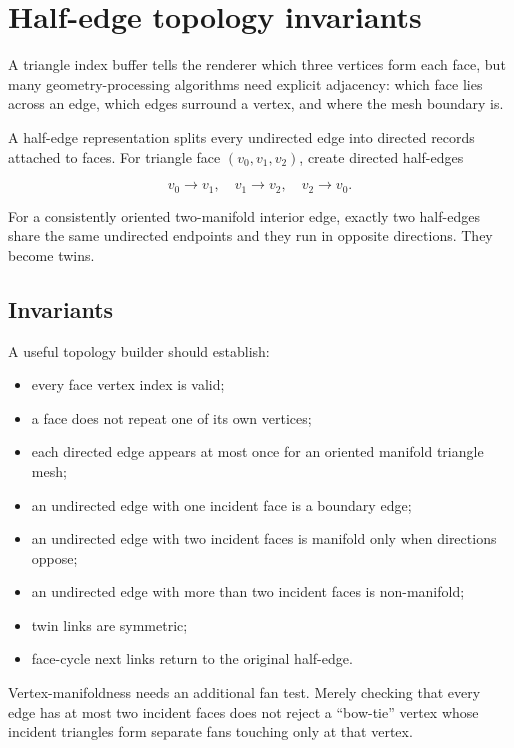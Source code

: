 \hypertarget{appendix-faac749c9cdd}{}\label{referencestart:appendix-faac749c9cdd}
\section{Half-edge topology invariants}\label{appendix-faac749c9cdd-half-edge-topology-invariants}

A triangle index buffer tells the renderer which three vertices form each face, but many geometry-processing algorithms need explicit adjacency: which face lies across an edge, which edges surround a vertex, and where the mesh boundary is.

A half-edge representation splits every undirected edge into directed records attached to faces. For triangle face \((v_0,v_1,v_2)\), create directed half-edges

\[
v_0\rightarrow v_1,\quad
v_1\rightarrow v_2,\quad
v_2\rightarrow v_0.
\]

For a consistently oriented two-manifold interior edge, exactly two half-edges share the same undirected endpoints and they run in opposite directions. They become twins.

\subsection{Invariants}\label{appendix-faac749c9cdd-invariants}

A useful topology builder should establish:

\begin{itemize}
\tightlist
\item
  every face vertex index is valid;
\item
  a face does not repeat one of its own vertices;
\item
  each directed edge appears at most once for an oriented manifold triangle mesh;
\item
  an undirected edge with one incident face is a boundary edge;
\item
  an undirected edge with two incident faces is manifold only when directions oppose;
\item
  an undirected edge with more than two incident faces is non-manifold;
\item
  twin links are symmetric;
\item
  face-cycle next links return to the original half-edge.
\end{itemize}

Vertex-manifoldness needs an additional fan test. Merely checking that every edge has at most two incident faces does not reject a ``bow-tie'' vertex whose incident triangles form separate fans touching only at that vertex.

